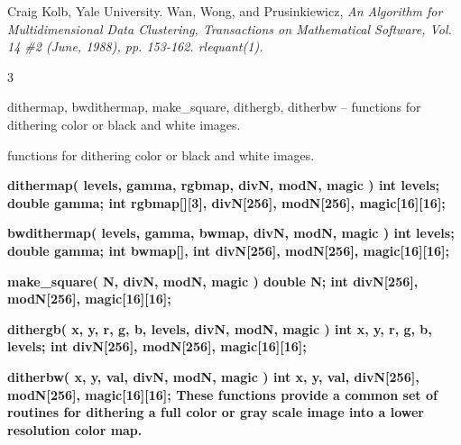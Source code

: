 Craig Kolb, Yale University.
Wan, Wong, and Prusinkiewicz,
%
\it An Algorithm for Multidimensional Data Clustering, %
\rm Transactions on Mathematical Software, Vol. 14 \#2 (June, 1988), pp. 153-162.
{\it rlequant}{\rm (1).}
\newpage


%
%
%
 3
\begin{TPlist}
{dithermap, bwdithermap, make\_square, dithergb, 
ditherbw -- functions for dithering color or black and white images.}
\item[{dithermap, bwdithermap, make\_square, dithergb, 
ditherbw --}] functions for dithering color or black and white images.
\end{TPlist} 
\raggedright
\par\vspace{1.0\baselineskip}
\bf
dithermap( levels, gamma, rgbmap, divN, modN, magic )
\nwl
\bf
int levels;
\nwl
\bf
double gamma;
\nwl
\bf
int rgbmap[][3], divN[256], modN[256], magic[16][16];
\par\vspace{1.0\baselineskip}
\bf
bwdithermap( levels, gamma, bwmap, divN, modN, magic )
\nwl
\bf
int levels;
\nwl
\bf
double gamma;
\nwl
\bf
int bwmap[], int divN[256], modN[256], magic[16][16];
\par\vspace{1.0\baselineskip}
\bf
make\_square( N, divN, modN, magic )
\nwl
\bf
double N;
\nwl
\bf
int divN[256], modN[256], magic[16][16];
\par\vspace{1.0\baselineskip}
\bf
dithergb( x, y, r, g, b, levels, divN, modN, magic )
\nwl
\bf
int x, y, r, g, b, levels;
\nwl
\bf
int divN[256], modN[256], magic[16][16];
\par\vspace{1.0\baselineskip}
\bf
ditherbw( x, y, val, divN, modN, magic )
\nwl
\bf
int x, y, val, divN[256], modN[256], magic[16][16];
These functions provide a common set of routines for dithering a full
color or gray scale image into a lower resolution color map.  

